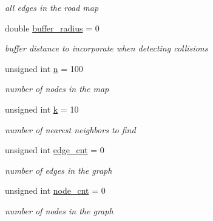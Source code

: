\begin{DoxyCompactItemize}
\begin{DoxyCompactList}\small\item\em all edges in the road map \end{DoxyCompactList}\item 
\mbox{\label{classprm_1_1RoadMap_a9caa7aa9541cfae82f0f848ab6accffb}} 
double \hyperlink{classprm_1_1RoadMap_a9caa7aa9541cfae82f0f848ab6accffb}{buffer\+\_\+radius} = 0
\begin{DoxyCompactList}\small\item\em buffer distance to incorporate when detecting collisions \end{DoxyCompactList}\item 
\mbox{\label{classprm_1_1RoadMap_a03d4a7e9302f36c8e0a2bbeaeaba2c5e}} 
unsigned int \hyperlink{classprm_1_1RoadMap_a03d4a7e9302f36c8e0a2bbeaeaba2c5e}{n} = 100
\begin{DoxyCompactList}\small\item\em number of nodes in the map \end{DoxyCompactList}\item 
\mbox{\label{classprm_1_1RoadMap_ad761640fd616fead6e1943a6f493750b}} 
unsigned int \hyperlink{classprm_1_1RoadMap_ad761640fd616fead6e1943a6f493750b}{k} = 10
\begin{DoxyCompactList}\small\item\em number of nearest neighbors to find \end{DoxyCompactList}\item 
\mbox{\label{classprm_1_1RoadMap_ad5b8d4f3c026cc9e4b5bd8dff74a107e}} 
unsigned int \hyperlink{classprm_1_1RoadMap_ad5b8d4f3c026cc9e4b5bd8dff74a107e}{edge\+\_\+cnt} = 0
\begin{DoxyCompactList}\small\item\em number of edges in the graph \end{DoxyCompactList}\item 
\mbox{\label{classprm_1_1RoadMap_a805350e531aa3e4992d941c399461842}} 
unsigned int \hyperlink{classprm_1_1RoadMap_a805350e531aa3e4992d941c399461842}{node\+\_\+cnt} = 0
\begin{DoxyCompactList}\small\item\em number of nodes in the graph \end{DoxyCompactList}\end{DoxyCompactItemize}


